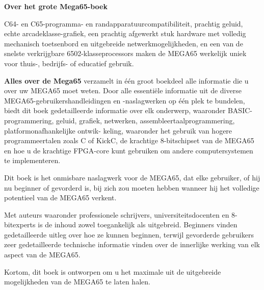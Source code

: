 \enlargethispage{3\baselineskip}
\thispagestyle{empty}
\pagecolor[HTML]{2244FF}

\begin{center}
\begin{minipage}{.8\textwidth}
\color{white}
\begin{center}
{ \huge\bfseries\sffamily\color{white}Over het grote Mega65-boek }
\end{center}

\vspace{3mm}
\hrulefill
\vspace{3mm}

{
C64- en C65-programma- en randapparatuurcompatibiliteit, prachtig geluid, echte arcadeklasse-grafiek, een
prachtig afgewerkt stuk hardware met volledig mechanisch toetsenbord en uitgebreide netwerkmogelijkheden,
en een van de snelste verkrijgbare 6502-klasseprocessors maken de MEGA65 werkelijk uniek voor thuis-, bedrijfs-
of educatief gebruik.

\vspace{2mm}

{\bf Alles over de Mega65} verzamelt in één groot boekdeel alle informatie die u over uw MEGA65
moet weten.  Door alle essentiële informatie uit de diverse MEGA65-gebruikershandleidingen en
-naslagwerken op één plek te bundelen, biedt dit boek gedetailleerde informatie over elk onderwerp, waaronder
BASIC-programmering, geluid, grafiek, netwerken, assembleertaalprogrammering, platformonafhankelijke ontwik-
keling, waaronder het gebruik van hogere programmeertalen zoals C of KickC, de krachtige 8-bitschipset van de
MEGA65 en hoe u de krachtige FPGA-core kunt gebruiken om andere computersystemen te implementeren.

\vspace{2mm}

Dit boek is het onmisbare naslagwerk voor de MEGA65, dat elke gebruiker, of hij nu beginner of gevorderd is,
bij zich zou moeten hebben wanneer hij het volledige potentieel van de MEGA65 verkent.

\vspace{2mm}

Met auteurs waaronder professionele schrijvers, universiteitsdocenten en 8-bitexperts is de inhoud zowel
toegankelijk als uitgebreid.  Beginners vinden gedetailleerde uitleg over hoe ze kunnen beginnen, terwijl
gevorderde gebruikers zeer gedetailleerde technische informatie vinden over de innerlijke werking van  elk
aspect van de MEGA65.

\vspace{2mm}

Kortom, dit boek is ontworpen om u het maximale uit de uitgebreide mogelijkheden van de MEGA65 te laten halen.
}

\end{minipage}
\end{center}

